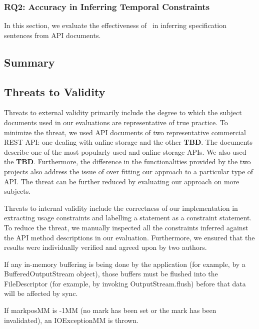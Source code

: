 \subsubsection{RQ2: Accuracy in Inferring Temporal Constraints}

In this section, we evaluate the effectiveness of \tool\ in inferring specification sentences from API documents.

\subsection{Summary}
\label{sub:summary}



\subsection{Threats to Validity}
\label{sub:threats_to_validity}
Threats to external validity primarily include the degree to which the subject documents used in our evaluations are representative of true practice. To minimize the threat, we used API documents of two representative commercial REST API: one dealing with online storage and the other \textbf{TBD}. The \amazon documents describe one of the most popularly used and online storage APIs. We also used the \textbf{TBD}. Furthermore, the difference in the functionalities provided by the two projects also address the issue of over fitting our approach to a particular type of API. The threat can be further reduced by evaluating our approach on more subjects. 

Threats to internal validity include the correctness of our implementation in extracting usage constraints and labelling a statement as a constraint statement. To reduce the threat, we manually inspected all the constraints inferred against the API method descriptions in our evaluation. Furthermore, we ensured that the results were individually verified and agreed
upon by two authors.




If any in-memory buffering is being done by the application (for example, by a BufferedOutputStream object), those buffers must be flushed into the FileDescriptor (for example, by invoking OutputStream.flush) before that data will be affected by sync.


If markposMM is -1MM (no mark has been set or the mark has been invalidated), an IOExceptionMM is thrown.